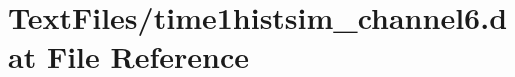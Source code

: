 \hypertarget{TextFiles_2time1histsim__channel6_8dat}{}\section{Text\+Files/time1histsim\+\_\+channel6.dat File Reference}
\label{TextFiles_2time1histsim__channel6_8dat}
